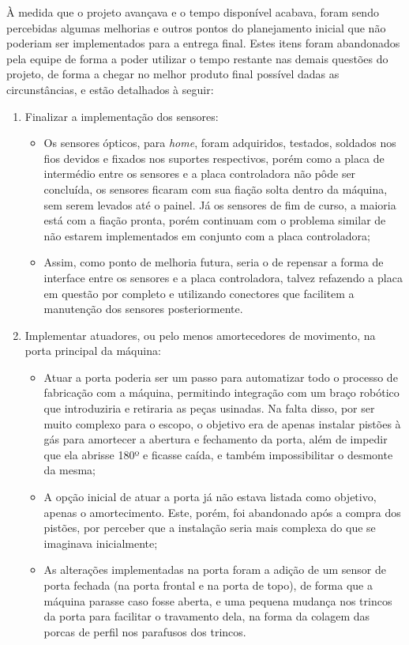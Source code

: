 \documentclass[
	article,			%
	11pt,				%
	oneside,			%
	a4paper,			%
	section=TITLE,		%
	english,			%
	brazil,				%
	sumario=tradicional
	]{abntex2}
\begin{document}
À medida que o projeto avançava e o tempo disponível acabava, foram sendo percebidas algumas melhorias e outros pontos do planejamento inicial que não poderiam ser implementados para a entrega final. Estes itens foram abandonados pela equipe de forma a poder utilizar o tempo restante nas demais questões do projeto, de forma a chegar no melhor produto final possível dadas as circunstâncias, e estão detalhados à seguir:
\begin{enumerate}
    \item Finalizar a implementação dos sensores:
    \begin{itemize}
        \item Os sensores ópticos, para \textit{home}, foram adquiridos, testados, soldados nos fios devidos e fixados nos suportes respectivos, porém como a placa de intermédio entre os sensores e a placa controladora não pôde ser concluída, os sensores ficaram com sua fiação solta dentro da máquina, sem serem levados até o painel. Já os sensores de fim de curso, a maioria está com a fiação pronta, porém continuam com o problema similar de não estarem implementados em conjunto com a placa controladora;
        \item Assim, como ponto de melhoria futura, seria o de repensar a forma de interface entre os sensores e a placa controladora, talvez refazendo a placa em questão por completo e utilizando conectores que facilitem a manutenção dos sensores posteriormente.
    \end{itemize}
    \item Implementar atuadores, ou pelo menos amortecedores de movimento, na porta principal da máquina:
    \begin{itemize}
        \item Atuar a porta poderia ser um passo para automatizar todo o processo de fabricação com a máquina, permitindo integração com um braço robótico que introduziria e retiraria as peças usinadas. Na falta disso, por ser muito complexo para o escopo, o objetivo era de apenas instalar pistões à gás para amortecer a abertura e fechamento da porta, além de impedir que ela abrisse 180º e ficasse caída, e também impossibilitar o desmonte da mesma;
        \item A opção inicial de atuar a porta já não estava listada como objetivo, apenas o amortecimento. Este, porém, foi abandonado após a compra dos pistões, por perceber que a instalação seria mais complexa do que se imaginava inicialmente;
        \item As alterações implementadas na porta foram a adição de um sensor de porta fechada (na porta frontal e na porta de topo), de forma que a máquina parasse caso fosse aberta, e uma pequena mudança nos trincos da porta para facilitar o travamento dela, na forma da colagem das porcas de perfil nos parafusos dos trincos.

\end{itemize}
\end{enumerate}
\end{document}
